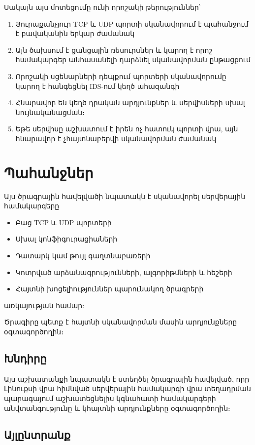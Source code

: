\documentclass[11pt]{article}
\begin{document}
\begin{sloppypar}
Սակայն այս մոտեցումը ունի որոշակի թերություններ՝

\begin{enumerate}
\item Յուրաքանչյուր TCP և UDP պորտի սկանավորում է պահանջում է
    բավականին երկար ժամանակ
\item Այն ծախսում է ցանցային ռեսուրսներ և կարող է որոշ համակարգեր
    անհասանելի դարձնել սկանավորման ընթացքում
\item Որոշակի սցենարների դեպքում պորտերի սկանավորումը կարող է
    հանգեցնել IDS-ում կեղծ ահազանգի
\item Հնարավոր են կեղծ դրական արդյունքներ և սերվիսների սխալ նույնականացման։
\item Եթե սերվիսը աշխատում է իրեն ոչ հատուկ պորտի վրա, այն հնարավոր է
    չհայտնաբերվի սկանավորման ժամանակ
\end{enumerate}


\section{Պահանջներ}

Այս ծրագրային հավելվածի նպատակն է սկանավորել սերվերային համակարգերը

\begin{itemize}
\item Բաց TCP և UDP պորտերի
\item Սխալ կոնֆիգուրացիաների
\item Դատարկ կամ թույլ գաղտնաբառերի
\item Կոտրված արձանագրությունների, ալգորիթմների և հեշերի
\item Հայտնի խոցելիություններ պարունակող ծրագրերի
\end{itemize}

առկայության համար:

Ծրագիրը պետք է հայտնի սկանավորման մասին արդյունքները օգտագործողին։


\subsection{Խնդիրը}

Այս աշխատանքի նպատակն է ստեղծել ծրագրային հավելված, որը Լինուքսի
վրա հիմնված սերվերային համակարգի վրա տեղադրման պարագայում
աշխատեցնելիս կգնահատի
համակարգերի անվտանգությունը և կհայտնի արդյունքները օգտագործողին։


\subsection{Այլընտրանք}


\end{sloppypar}
\end{document}
